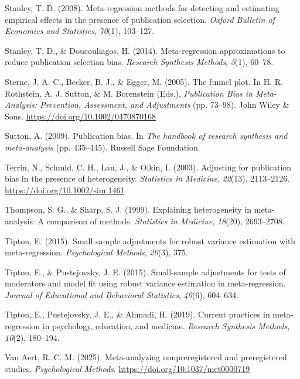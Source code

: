 \documentclass[
  american,
  man, donotrepeattitle,floatsintext]{apa7}
\newlength{\cslhangindent}
\newenvironment{CSLReferences}[2] %
 {\begin{list}{}{%
  \setlength{\itemindent}{0pt}
  \setlength{\leftmargin}{0pt}
  \setlength{\parsep}{0pt}
  \ifodd #1
   \setlength{\leftmargin}{\cslhangindent}
   \setlength{\itemindent}{-1\cslhangindent}
  \fi
  \setlength{\itemsep}{#2\baselineskip}}}
 {\end{list}}
\begin{document}
\begin{CSLReferences}{1}{0}
Stanley, T. D. (2008). Meta-regression methods for detecting and estimating empirical effects in the presence of publication selection. \emph{Oxford Bulletin of Economics and Statistics}, \emph{70}(1), 103--127.

Stanley, T. D., \& Doucouliagos, H. (2014). Meta-regression approximations to reduce publication selection bias. \emph{Research Synthesis Methods}, \emph{5}(1), 60--78.

Sterne, J. A. C., Becker, B. J., \& Egger, M. (2005). The funnel plot. In H. R. Rothstein, A. J. Sutton, \& M. Borenstein (Eds.), \emph{Publication {Bias} in {Meta-Analysis}: {Prevention}, {Assessment}, and {Adjustments}} (pp. 73--98). {John Wiley \& Sons}. \url{https://doi.org/10.1002/0470870168}

Sutton, A. (2009). Publication bias. In \emph{The handbook of research synthesis and meta-analysis} (pp. 435--445). Russell Sage Foundation.

Terrin, N., Schmid, C. H., Lau, J., \& Olkin, I. (2003). Adjusting for publication bias in the presence of heterogeneity. \emph{Statistics in Medicine}, \emph{22}(13), 2113--2126. \url{https://doi.org/10.1002/sim.1461}

Thompson, S. G., \& Sharp, S. J. (1999). Explaining heterogeneity in meta-analysis: A comparison of methods. \emph{Statistics in Medicine}, \emph{18}(20), 2693--2708.

Tipton, E. (2015). Small sample adjustments for robust variance estimation with meta-regression. \emph{Psychological Methods}, \emph{20}(3), 375.

Tipton, E., \& Pustejovsky, J. E. (2015). Small-sample adjustments for tests of moderators and model fit using robust variance estimation in meta-regression. \emph{Journal of Educational and Behavioral Statistics}, \emph{40}(6), 604--634.

Tipton, E., Pustejovsky, J. E., \& Ahmadi, H. (2019). Current practices in meta-regression in psychology, education, and medicine. \emph{Research Synthesis Methods}, \emph{10}(2), 180--194.

Van Aert, R. C. M. (2025). Meta-analyzing nonpreregistered and preregistered studies. \emph{Psychological Methods}. \url{https://doi.org/10.1037/met0000719}


\end{CSLReferences}
\end{document}
